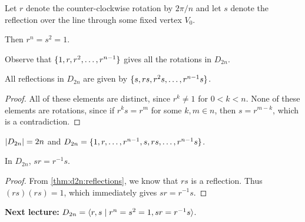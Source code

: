 \begin{notation}
    Let $r$ denote the counter-clockwise rotation by $2\pi / n$ and
    let $s$ denote the reflection over the line through some fixed vertex
    $V_0$.

    Then $r^n = s^2 = 1$.

    Observe that $\{1, r, r^2, \dots, r^{n-1}\}$ gives all the rotations
    in $D_{2n}$.
\end{notation}

\begin{lemma} \label{thm:d2n:reflections}
    All reflections in $D_{2n}$ are given by
    $\{s, rs, r^2s, \dots, r^{n-1}s\}$.
\end{lemma}
\begin{proof}
    All of these elements are distinct, since $r^k \ne 1$ for $0 < k < n$.
    None of these elements are rotations, since if $r^k s = r^m$ for some
    $k, m \in n$, then $s = r^{m-k}$, which is a contradiction.
\end{proof}

\begin{theorem}
    $\lvert D_{2n}\rvert = 2n$ and
    $D_{2n} = \{1, r, \dots, r^{n-1}, s, rs, \dots, r^{n-1}s\}$.
\end{theorem}

\begin{proposition}
    In $D_{2n}$, $sr = r^{-1}s$.
\end{proposition}
\begin{proof}
    From \cref{thm:d2n:reflections}, we know that $rs$ is a reflection.
    Thus $(rs)(rs) = 1$, which immediately gives $sr = r^{-1}s$.
\end{proof}

\textbf{Next lecture:}
$D_{2n} = \langle r, s \mid r^n = s^2 = 1, sr = r^{-1}s\rangle$.
